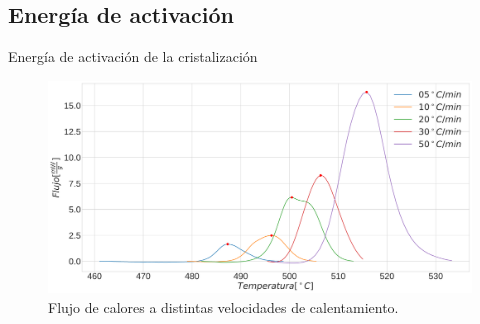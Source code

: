 \documentclass[11pt]{beamer}
\begin{document}
	\subsection{Energía de activación}
		\begin{frame}{Energía de activación de la cristalización}
			\begin{figure}
				\includegraphics[scale=0.15]{img/DSCPeaks.png}
				\caption*{Flujo de calores a distintas velocidades de calentamiento.}
			\end{figure}
		\end{frame}
		
\end{document}
